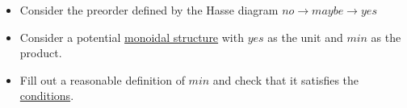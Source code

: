 \begin{itemize}
    \item  Consider the preorder defined by the Hasse diagram $\boxed{no \rightarrow maybe \rightarrow yes}$
    \item Consider a potential \hyperref[D2.2]{monoidal structure} with $yes$ as the unit and $min$ as the product.
    \item Fill out a reasonable definition of $min$ and check that it satisfies the \hyperref[D2.2]{conditions}.
  \end{itemize}